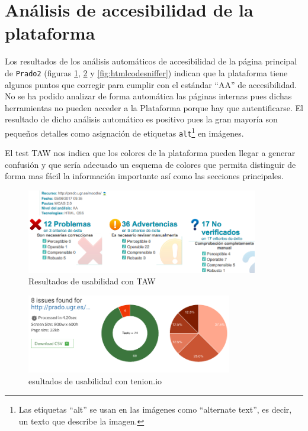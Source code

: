 \section{Análisis de accesibilidad de la plataforma}

Los resultados de los análisis automáticos de accesibilidad de la página principal de \texttt{Prado2} (figuras \ref{fig:tawdis}, \ref{fig:tenon} y \ref{fig:htmlcodesniffer}) indican que la plataforma tiene algunos puntos que corregir para cumplir con el estándar ``AA'' de accesibilidad. No se ha podido analizar de forma automática las páginas internas pues dichas herramientas no pueden acceder a la Plataforma porque hay que autentificarse. El resultado de dicho análisis automático es positivo pues la gran mayoría son pequeños detalles como asignación de etiquetas \texttt{alt}\footnote{Las etiquetas ``alt'' se usan en las imágenes como ``alternate text'', es decir, un texto que describe la imagen.} en imágenes.

\bigskip
El test TAW nos indica que los colores de la plataforma pueden llegar a generar confusión y que sería adecuado un esquema de colores que permita distinguir de forma mas fácil la información importante así como las secciones principales.

\begin{figure}[H]
\centering
\includegraphics[width=0.9\textwidth]{../screenshots/tawdis}
\caption{Resultados de usabilidad con TAW}
\label{fig:tawdis}
\end{figure}

\begin{figure}[H]
\centering
\includegraphics[width=0.8\textwidth]{../screenshots/tenon}
\caption{esultados de usabilidad con tenion.io}
\label{fig:tenon}
\end{figure}

